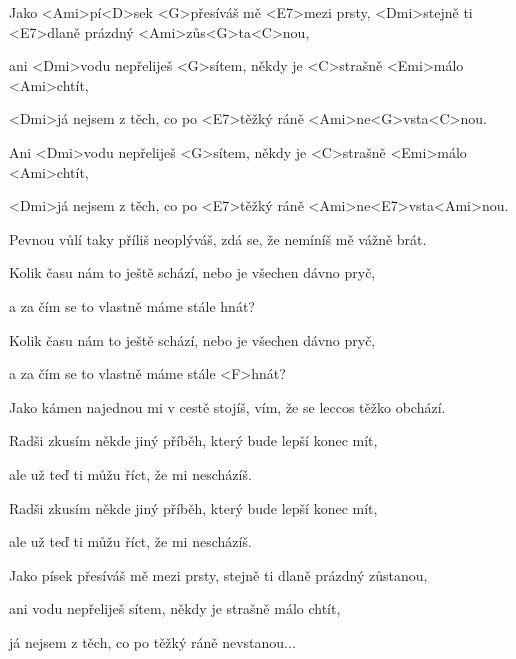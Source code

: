 

\zs
Jako <Ami>pí<D>sek <G>přesíváš mě <E7>mezi prsty,
<Dmi>stejně ti <E7>dlaně prázdný <Ami>zůs<G>ta<C>nou, 

ani <Dmi>vodu nepřeliješ <G>sítem,
někdy je <C>strašně <Emi>málo <Ami>chtít,

<Dmi>já nejsem z těch, co po <E7>těžký ráně
<Ami>ne<G>vsta<C>nou.

Ani <Dmi>vodu nepřeliješ <G>sítem,
někdy je <C>strašně <Emi>málo <Ami>chtít, 

<Dmi>já nejsem z těch, co po <E7>těžký ráně
<Ami>ne<E7>vsta<Ami>nou. \ks

\zs
Pevnou vůlí taky příliš neoplýváš, zdá se, že nemíníš mě vážně brát. 

Kolik času nám to ještě schází, nebo je všechen dávno pryč, 

a za čím se to vlastně máme stále hnát? 

Kolik času nám to ještě schází, nebo je všechen dávno pryč, 

a za čím se to vlastně máme stále <F>hnát? 
\ks

\zs
Jako kámen najednou mi v cestě stojíš, vím, že se leccos těžko obchází. 

Radši zkusím někde jiný příběh, který bude lepší konec mít, 

ale už teď ti můžu říct, že mi nescházíš. 

Radši zkusím někde jiný příběh, který bude lepší konec mít, 

ale už teď ti můžu říct, že mi nescházíš. 
\ks

\zs
Jako písek přesíváš mě mezi prsty, stejně ti dlaně prázdný zůstanou, 

ani vodu nepřeliješ sítem, někdy je strašně málo chtít, 

já nejsem z těch, co po těžký ráně nevstanou...
\ks

\kp

